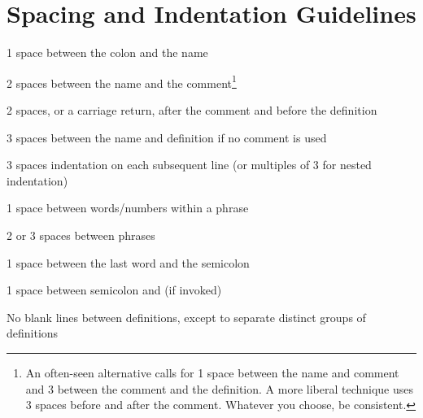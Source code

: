 \section{Spacing and Indentation Guidelines}%

\begin{tfquot}
1 space between the colon and the name

2 spaces between the name and the comment\footnote{
An often-seen alternative calls for 1 space between the name and comment
and 3 between the comment and the definition. A more liberal technique
uses 3 spaces before and after the comment. Whatever you choose, be
consistent.}

2 spaces, or a carriage return, after the comment and before the
definition\footnotemark[1]

3 spaces between the name and definition if no comment is used

3 spaces indentation on each subsequent line (or multiples of 3 for nested
indentation)

1 space between words/numbers within a phrase

2 or 3 spaces between phrases

1 space between the last word and the semicolon

1 space between semicolon and  (if invoked)
\end{tfquot}
No blank lines between definitions, except to separate distinct groups of
definitions

